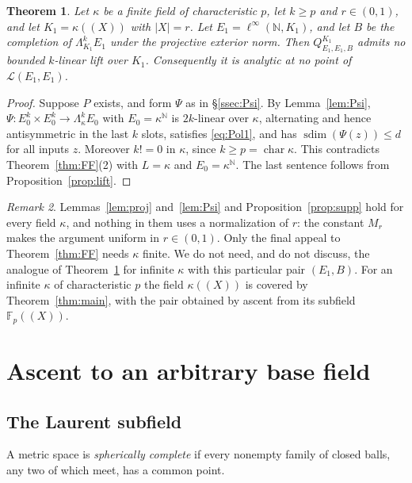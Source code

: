 \documentclass[11pt]{amsart}
\newtheorem{theorem}{Theorem}
\theoremstyle{definition}
\theoremstyle{remark}
\newtheorem{remark}[theorem]{Remark}
\numberwithin{equation}{section}
\newcommand{\linf}{\ell^\infty}
\newcommand{\N}{\mathbb{N}}
\newcommand{\F}{\mathbb{F}}
\newcommand{\cL}{\mathcal{L}}
\newcommand{\sdim}{\operatorname{sdim}}
\newcommand{\abs}[1]{\lvert #1\rvert}
\begin{document}
\begin{theorem}\label{thm:laurent}
Let $\kappa$ be a finite field of characteristic $p$, let $k\ge p$ and $r\in(0,1)$, and let $K_1=\kappa((X))$ with
$\abs X=r$. Let $E_1=\linf(\N,K_1)$, and let $B$ be the completion of $\Lambda^k_{K_1}E_1$ under the projective exterior
norm. Then $Q^{K_1}_{E_1,E_1,B}$ admits no bounded $k$\nobreakdash-linear lift over $K_1$. Consequently it is analytic at no point of
$\cL(E_1,E_1)$.
\end{theorem}

\begin{proof}
Suppose $P$ exists, and form $\Psi$ as in \S\ref{ssec:Psi}. By Lemma~\ref{lem:Psi},
$\Psi\colon E_0^k\times E_0^k\to\Lambda^k_\kappa E_0$ with $E_0=\kappa^\N$ is $2k$\nobreakdash-linear over $\kappa$, alternating and hence
antisymmetric in the last $k$ slots, satisfies \eqref{eq:Pol1}, and has $\sdim(\Psi(z))\le d$ for all inputs $z$. Moreover
$k!=0$ in $\kappa$, since $k\ge p=\operatorname{char}\kappa$. This contradicts Theorem~\ref{thm:FF}(2) with $L=\kappa$
and $E_0=\kappa^\N$. The last sentence follows from Proposition~\ref{prop:lift}.
\end{proof}

\begin{remark}\label{rem:infkappa}
Lemmas~\ref{lem:proj} and~\ref{lem:Psi} and Proposition~\ref{prop:supp} hold for every field $\kappa$, and nothing in them
uses a normalization of $r$: the constant $M_r$ makes the argument uniform in $r\in(0,1)$. Only the final appeal to
Theorem~\ref{thm:FF} needs $\kappa$ finite. We do not need, and do not discuss, the analogue of
Theorem~\ref{thm:laurent} for infinite $\kappa$ with this particular pair $(E_1,B)$. For an infinite $\kappa$ of
characteristic $p$ the field $\kappa((X))$ is covered by Theorem~\ref{thm:main}, with the pair obtained by ascent from its
subfield $\F_p((X))$.
\end{remark}

\section{Ascent to an arbitrary base field}\label{sec:ascent}

\subsection{The Laurent subfield}
A metric space is \emph{spherically complete} if every nonempty family of closed balls, any two of which meet, has a
common point.
\end{document}
